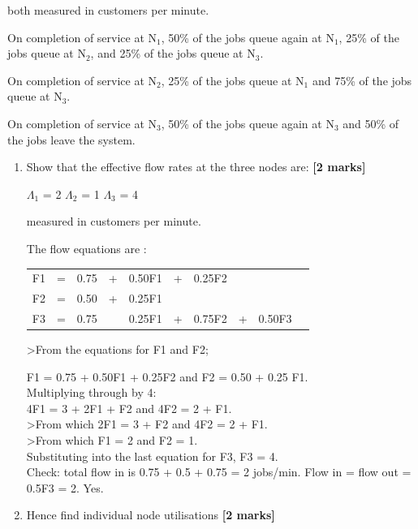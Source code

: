 \begin{enumerate}
both measured in customers per minute.

On completion of service at N$_1$,
50\% of the jobs queue again at N$_1$,
25\% of the jobs queue at N$_2$, and
25\% of the jobs queue at N$_3$.

On completion of service at N$_2$,
25\% of the jobs queue at N$_1$ and
75\% of the jobs queue at N$_3$.

On completion of service at N$_3$,
50\% of the jobs queue again at N$_3$
and 50\% of the jobs leave the system.

\begin{enumerate}

\item Show that the effective flow rates at the three nodes are:
\hfill {\bf [2 marks]}\\

\begin{center}
$\Lambda_1$ = 2 \hspace*{0.5in} 
$\Lambda_2$ = 1 \hspace*{0.5in} 
$\Lambda_3$ = 4
\end{center}

measured in customers per minute.

{\sf 
The flow equations are :

\begin{tabular}{l c r c r c rc rc}
F1 & = & 0.75 & + & 0.50F1 & +  & 0.25F2 &  & \\
F2 & = & 0.50 & + & 0.25F1 &    &         &  & \\
F3 & = & 0.75 &   & 0.25F1 & +  & 0.75F2 & + & 0.50F3 \\
\end{tabular}

>From the equations for F1 and F2;

F1  =  0.75  +  0.50F1  +   0.25F2 and F2 = 0.50 + 0.25 F1.\\
Multiplying through by 4:\\
4F1  =  3 +  2F1  +   F2 and 4F2 = 2 + F1.\\
>From which 2F1 = 3 + F2 and   4F2 = 2 + F1.\\
>From which F1 = 2 and F2 = 1.\\
Substituting into the last equation for F3, F3 = 4.\\

Check: total flow in is 0.75 + 0.5 + 0.75 = 2 jobs/min.
Flow in = flow out = 0.5F3 = 2. Yes.

}


\item Hence find individual node utilisations   \hfill {\bf [2 marks]}\\


\end{enumerate}
\end{enumerate}
